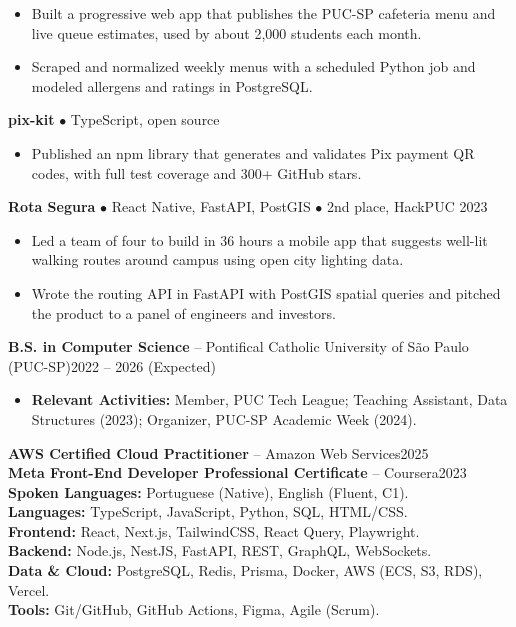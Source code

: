 \begin{itemize}
\item Built a progressive web app that publishes the PUC-SP cafeteria menu and live queue estimates, used by about 2,000 students each month.
\item Scraped and normalized weekly menus with a scheduled Python job and modeled allergens and ratings in PostgreSQL.
\end{itemize}
\vspace{3pt}
\textbf{pix-kit} $\bullet$ TypeScript, open source
\begin{itemize}
\item Published an npm library that generates and validates Pix payment QR codes, with full test coverage and 300+ GitHub stars.
\end{itemize}
\vspace{3pt}
\textbf{Rota Segura} $\bullet$ React Native, FastAPI, PostGIS $\bullet$ 2nd place, HackPUC 2023
\begin{itemize}
\item Led a team of four to build in 36 hours a mobile app that suggests well-lit walking routes around campus using open city lighting data.
\item Wrote the routing API in FastAPI with PostGIS spatial queries and pitched the product to a panel of engineers and investors.
\end{itemize}
\textbf{B.S. in Computer Science} -- Pontifical Catholic University of São Paulo (PUC-SP)\hfill 2022 -- 2026 (Expected)
\begin{itemize}
\item \textbf{Relevant Activities:} Member, PUC Tech League; Teaching Assistant, Data Structures (2023); Organizer, PUC-SP Academic Week (2024).
\end{itemize}
\textbf{AWS Certified Cloud Practitioner} -- Amazon Web Services\hfill 2025\\
\textbf{Meta Front-End Developer Professional Certificate} -- Coursera\hfill 2023
\textbf{Spoken Languages:} Portuguese (Native), English (Fluent, C1).\\
\textbf{Languages:} TypeScript, JavaScript, Python, SQL, HTML/CSS.\\
\textbf{Frontend:} React, Next.js, TailwindCSS, React Query, Playwright.\\
\textbf{Backend:} Node.js, NestJS, FastAPI, REST, GraphQL, WebSockets.\\
\textbf{Data \& Cloud:} PostgreSQL, Redis, Prisma, Docker, AWS (ECS, S3, RDS), Vercel.\\
\textbf{Tools:} Git/GitHub, GitHub Actions, Figma, Agile (Scrum).
